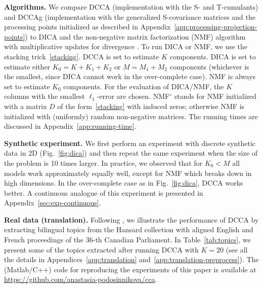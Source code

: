 \documentclass{article}
\newcommand{\ppp}{\textbf}
\begin{document}
\ppp{Algorithms.} We compare DCCA (implementation with the S- and T-cumulants) and DCCAg (implementation with the generalized S-covariance matrices and the processing points initialized as described in Appendix~\ref{app:processing-projection-points}) to DICA and the non-negative matrix factorization (NMF) algorithm with multiplicative updates for divergence \citep{LeeSeu2000}. To run DICA or NMF, we use the stacking trick~\eqref{stacking}. DCCA is set to estimate $K$ components. DICA is set to estimate either $K_0 = K+K_1+K_2$ or $M=M_1+M_2$ components (whichever is the smallest, since DICA cannot work in the over-complete case).  NMF is always set to estimate $K_0$ components. For the evaluation of DICA/NMF, the $K$ columns  with the smallest $\ell_1$-error are chosen. NMF$^{\circ}$ stands for NMF initialized with a matrix $D$ of the form~\eqref{stacking} with induced zeros; otherwise NMF is initialized with (uniformly) random non-negative matrices. The running times are discussed in Appendix~\ref{app:running-time}.

\ppp{Synthetic experiment.} We first perform an experiment with discrete synthetic data in 2D (Fig.~\ref{fig:dica}) and then repeat the same experiment when the size of the problem is 10 times larger. In practice, we observed that for $K_0<M$ all models work approximately equally well, except for NMF which breaks down in high dimensions. In the over-complete case as in Fig.~\ref{fig:dica}, DCCA works better. 
A continuous analogue of this experiment is presented in Appendix~\ref{sec:exp-continuous}.








\ppp{Real data (translation).}
Following \citet{VinEtAl2003}, we illustrate the performance of DCCA by extracting bilingual topics from the Hansard collection \citep{VinGir2002} with aligned English and French proceedings of the 36-th Canadian Parliament. 
In Table~\ref{tab:topics}, we present some of the topics extracted after running DCCA with $K=20$ (see all the details in Appendices~\ref{app:translation} and~\ref{app:translation-preprocess}). The (Matlab/C++) code for reproducing the experiments of this paper is available at \href{https://github.com/anastasia-podosinnikova/cca}{https://github.com/anastasia-podosinnikova/cca}.
\end{document}
